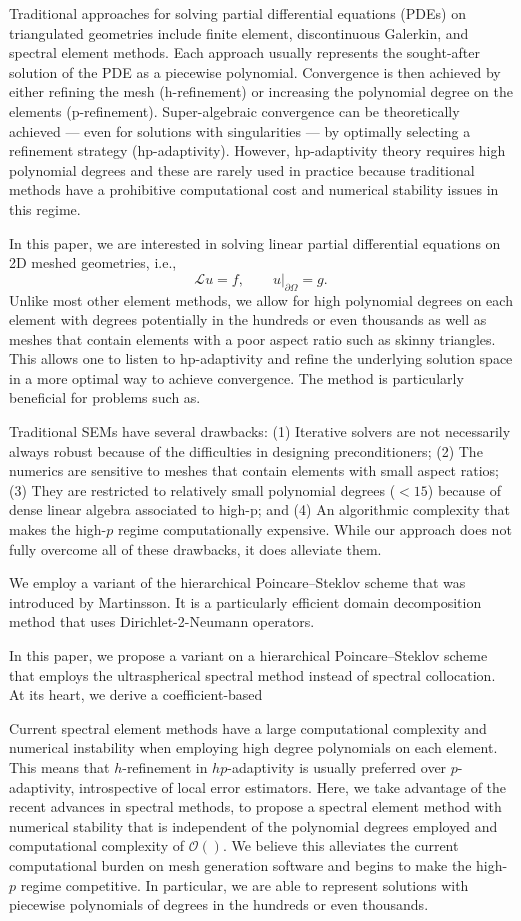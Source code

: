 \documentclass[review]{siamart171218}
\begin{document}
Traditional approaches for solving partial differential equations (PDEs) on triangulated geometries include finite element, discontinuous Galerkin, and spectral element methods. Each approach usually represents the sought-after solution of the PDE as a piecewise polynomial. Convergence is then achieved by either refining the mesh (h-refinement) or increasing the polynomial degree on the elements (p-refinement). Super-algebraic convergence can be theoretically achieved --- even for solutions with singularities ---  by optimally selecting a refinement strategy (hp-adaptivity). However, hp-adaptivity theory requires high polynomial degrees and these are rarely used in practice because traditional methods have a prohibitive computational cost and numerical stability issues in this regime.

In this paper, we are interested in solving linear partial differential equations on 2D meshed geometries, i.e., 
\[
\mathcal{L}u = f, \qquad u|_{\partial\Omega} = g.
\]
Unlike most other element methods, we allow for high polynomial degrees on each element with degrees potentially in the hundreds or even thousands as well as meshes that contain elements with a poor aspect ratio such as skinny triangles. This allows one to listen to hp-adaptivity and refine the underlying solution space in a more optimal way to achieve convergence. The method is particularly beneficial for problems such as.

Traditional SEMs have several drawbacks: (1) Iterative solvers are not necessarily always robust because of the difficulties in designing preconditioners; (2) The numerics are sensitive to meshes that contain elements with small aspect ratios; (3) They are restricted to relatively small polynomial degrees ($<15$) because of dense linear algebra associated to high-p; and (4) An algorithmic complexity that makes the high-$p$ regime computationally expensive. While our approach does not fully overcome all of these drawbacks, it does alleviate them. 

We employ a variant of the hierarchical Poincare--Steklov scheme that was introduced by Martinsson. It is a particularly efficient domain decomposition method that uses Dirichlet-2-Neumann operators. 

In this paper, we propose a variant on a hierarchical Poincare--Steklov scheme that employs the ultraspherical spectral method instead of spectral collocation. At its heart, we derive a coefficient-based 

Current spectral element methods have a large computational complexity and numerical instability when employing high degree polynomials on each element. This means that $h$-refinement in $hp$-adaptivity is usually preferred over $p$-adaptivity, introspective of local error estimators. Here, we take advantage of the recent advances in spectral methods, to propose a spectral element method with numerical stability that is independent of the polynomial degrees employed and computational complexity of $\mathcal{O}()$. We believe this alleviates the current computational burden on mesh generation software and begins to make the high-$p$ regime competitive. In particular, we are able to represent solutions with piecewise polynomials of degrees in the hundreds or even thousands. 
\end{document}
